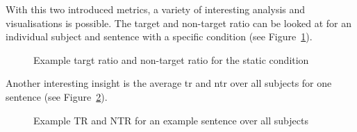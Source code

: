 \documentclass[
  12pt,
  letterpaper,
  DIV=11,
  numbers=noendperiod]{scrreprt}
\begin{document}
With this two introduced metrics, a variety of interesting analysis and
visualisations is possible. The target and non-target ratio can be
looked at for an individual subject and sentence with a specific
condition (see Figure~\ref{fig-trntrstatic}).

\begin{figure}


\caption{\label{fig-trntrstatic}Example targt ratio and non-target ratio
for the static condition}

\end{figure}%

Another interesting insight is the average tr and ntr over all subjects
for one sentence (see Figure~\ref{fig-trntrsentence}).

\begin{figure}


\caption{\label{fig-trntrsentence}Example TR and NTR for an example
sentence over all subjects}

\end{figure}%
\end{document}

